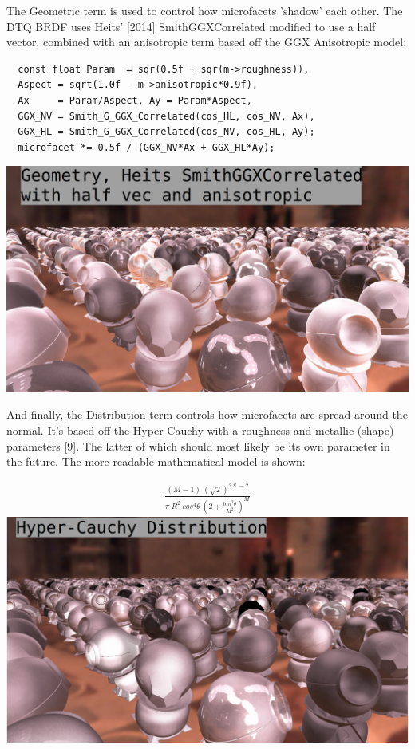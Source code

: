 \documentclass{article}
\begin{document}
  The Geometric term is used to control how microfacets 'shadow' each other. The DTQ BRDF uses Heits' [2014] SmithGGXCorrelated modified to use a half vector, combined with an anisotropic term based off the GGX Anisotropic model:
  \begin{lstlisting}
  const float Param  = sqr(0.5f + sqr(m->roughness)),
  Aspect = sqrt(1.0f - m->anisotropic*0.9f),
  Ax     = Param/Aspect, Ay = Param*Aspect,
  GGX_NV = Smith_G_GGX_Correlated(cos_HL, cos_NV, Ax),
  GGX_HL = Smith_G_GGX_Correlated(cos_NV, cos_HL, Ay);
  microfacet *= 0.5f / (GGX_NV*Ax + GGX_HL*Ay);
  \end{lstlisting}
  \includegraphics[scale=0.20]{geometric}
  
  And finally, the Distribution term controls how microfacets are spread around the normal. It's based off the Hyper Cauchy with a roughness and metallic (shape) parameters [9]. The latter of which should most likely be its own parameter in the future. The more readable mathematical model is shown:
  
  \begin{align}
  \frac{(M - 1)\:(\sqrt{2})^{2\:S\:-\:2}}
  	    {\pi\:R^{2}\:cos^{4}\theta\:(2 +
  	      \frac{tan^{2}\theta}{M^2})^M}
  \end{align}
  \includegraphics[scale=0.20]{distribution}
  
\end{document}
